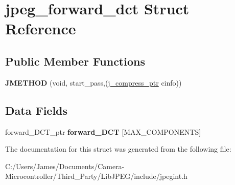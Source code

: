 \hypertarget{structjpeg__forward__dct}{}\section{jpeg\+\_\+forward\+\_\+dct Struct Reference}
\label{structjpeg__forward__dct}
\subsection*{Public Member Functions}
\begin{DoxyCompactItemize}
\item 
\mbox{\label{structjpeg__forward__dct_a3176e0fbee668d7d69c6574d1b14880c}} 
{\bfseries J\+M\+E\+T\+H\+OD} (void, start\+\_\+pass,(\hyperlink{structjpeg__compress__struct}{j\+\_\+compress\+\_\+ptr} cinfo))
\end{DoxyCompactItemize}
\subsection*{Data Fields}
\begin{DoxyCompactItemize}
\item 
\mbox{\label{structjpeg__forward__dct_ab9bed430cb64fd8ec654d5130dbe829e}} 
forward\+\_\+\+D\+C\+T\+\_\+ptr {\bfseries forward\+\_\+\+D\+CT} \mbox{[}M\+A\+X\+\_\+\+C\+O\+M\+P\+O\+N\+E\+N\+TS\mbox{]}
\end{DoxyCompactItemize}


The documentation for this struct was generated from the following file\+:\begin{DoxyCompactItemize}
\item 
C\+:/\+Users/\+James/\+Documents/\+Camera-\/\+Microcontroller/\+Third\+\_\+\+Party/\+Lib\+J\+P\+E\+G/include/jpegint.\+h\end{DoxyCompactItemize}
